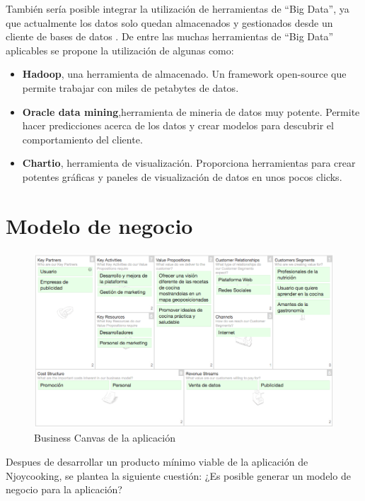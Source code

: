 \vspace{5 mm}

También sería posible integrar la utilización de herramientas de ``Big Data'', ya que actualmente los datos solo quedan almacenados y gestionados desde un cliente de bases de datos \cite{big-data-tools}. De entre las  muchas herramientas de ``Big Data'' aplicables se propone la utilización de algunas como:


\begin{itemize}
  \item \textbf{Hadoop}, una herramienta de almacenado. Un framework open-source que permite trabajar con miles de petabytes de datos.
  \item \textbf{Oracle data mining},herramienta de mineria de datos muy potente. Permite hacer predicciones acerca de los datos y crear modelos para descubrir el comportamiento del cliente.
  \item \textbf{Chartio}, herramienta de visualización. Proporciona herramientas para crear potentes gráficas y paneles de visualización de datos en
  unos pocos clicks.
\end{itemize}

\section{Modelo de negocio}

\begin{figure}
\begin{center}
\includegraphics[width=1.0\textwidth]{imagenes/business-canvas.png}
\caption{Business Canvas de la aplicación}
\label{business-canvas}
\end{center}
\end{figure}

Despues de desarrollar un producto mínimo viable de la aplicación de Njoycooking, se plantea la siguiente cuestión: ¿Es posible generar un modelo de negocio para la aplicación?

